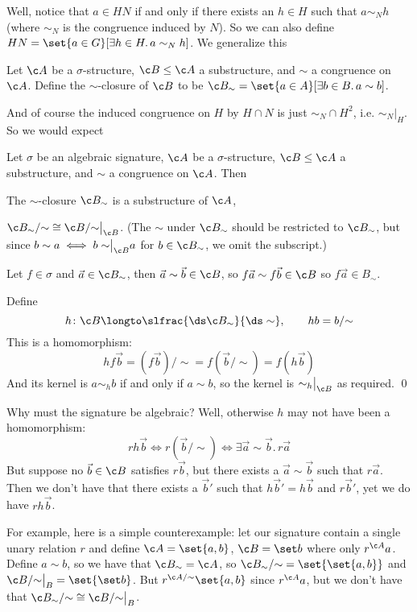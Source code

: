 Well, notice that $a\in HN$ if and only if there exists an $h\in H$ such that $a\sim_Nh$ (where $\sim_N$ is the congruence induced by $N$).
So we can also define $HN=\set{a\in G}[\exists h\in H.\,a\sim_Nh]$.
We generalize this

\bdefn

    Let $\c A$ be a $\sigma$-structure, $\c B\leq\c A$ a substructure, and $\sim$ a congruence on $\c A$.
    Define the {\emphcolor $\sim$-closure} of $\c B$ to be $\c B_\sim=\set{a\in A}[\exists b\in B.\,a\sim b]$.

\edefn

And of course the induced congruence on $H$ by $H\cap N$ is just $\sim_N\cap H^2$, i.e. $\sim_N\bigr|_H$.
So we would expect

\bthrm[title=The Second Isomorphism Theorem]

    Let $\sigma$ be an algebraic signature, $\c A$ be a $\sigma$-structure, $\c B\leq\c A$ a substructure, and $\sim$ a congruence on $\c A$.
    Then
    \benum
        \item The $\sim$-closure $\c B_\sim$ is a substructure of $\c A$,
        \item $\c B_\sim/{\sim}\cong\c B/{\sim}\bigr|_{\c B}$.
        (The $\sim$ under $\c B_\sim$ should be restricted to $\c B_\sim$, but since $b\sim a\iff b\sim\bigr|_{\c B}a$ for $b\in\c B_\sim$, we omit the subscript.)
    \eenum

\ethrm

\Proof
\benum
    \item Let $f\in\sigma$ and $\vec a\in\c B_\sim$, then $\vec a\sim\vec b\in\c B$, so $f\vec a\sim f\vec b\in\c B$ so $f\vec a\in B_\sim$.
    \item Define
    $$ h\colon\c B\longto\slfrac{\ds\c B_\sim}{\ds\sim},\qquad hb = b/{\sim} $$
    This is a homomorphism:
    $$ hf\vec b = (f\vec b)/\sim = f(\vec b/\sim) = f(h\vec b) $$
    And its kernel is $a\sim_hb$ if and only if $a\sim b$, so the kernel is $\sim_h\bigr|_{\c B}$ as required.
    \qed
\eenum

Why must the signature be algebraic?
Well, otherwise $h$ may not have been a homomorphism:
$$ rh\vec b \iff r(\vec b/{\sim}) \iff \exists\vec a\sim\vec b.\,r\vec a $$
But suppose no $\vec b\in\c B$ satisfies $r\vec b$, but there exists a $\vec a\sim\vec b$ such that $r\vec a$.
Then we don't have that there exists a $\vec b'$ such that $h\vec b'=h\vec b$ and $r\vec b'$, yet we do have $rh\vec b$.

For example, here is a simple counterexample: let our signature contain a single unary relation $r$ and define $\c A=\set{a,b}$, $\c B=\set b$ where only $r^{\c A}a$.
Define $a\sim b$, so we have that $\c B_\sim=\c A$, so $\c B_\sim/{\sim}=\set{\set{a,b}}$ and $\c B/{\sim\bigr|_B}=\set{\set b}$.
But $r^{\c A/{\sim}}\set{a,b}$ since $r^{\c A}a$, but we don't have that $\c B_\sim/{\sim}\cong\c B/{\sim\bigr|_B}$.

